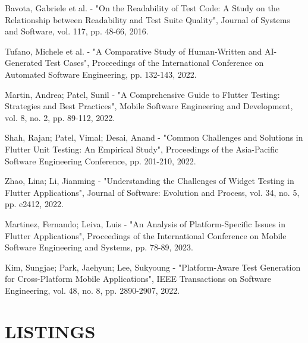 \documentclass[12pt, twoside]{report}
\makeatletter
\newcommand\AppendixName{Appendix}
\let\oldappendix\appendix
\renewcommand{\appendix}{%
  \oldappendix
  \renewcommand{\chaptername}{\AppendixName}  \renewcommand{\thechapter}{\@Alph\c@chapter}}
\makeatother
\begin{document}
\begin{thebibliography}{99}
Bavota, Gabriele et al. - "On the Readability of Test Code: A Study on the Relationship between Readability and Test Suite Quality", Journal of Systems and Software, vol. 117, pp. 48-66, 2016.

Tufano, Michele et al. - "A Comparative Study of Human-Written and AI-Generated Test Cases", Proceedings of the International Conference on Automated Software Engineering, pp. 132-143, 2022.

Martin, Andrea; Patel, Sunil - "A Comprehensive Guide to Flutter Testing: Strategies and Best Practices", Mobile Software Engineering and Development, vol. 8, no. 2, pp. 89-112, 2022.

Shah, Rajan; Patel, Vimal; Desai, Anand - "Common Challenges and Solutions in Flutter Unit Testing: An Empirical Study", Proceedings of the Asia-Pacific Software Engineering Conference, pp. 201-210, 2022.

Zhao, Lina; Li, Jianming - "Understanding the Challenges of Widget Testing in Flutter Applications", Journal of Software: Evolution and Process, vol. 34, no. 5, pp. e2412, 2022.

Martinez, Fernando; Leiva, Luis - "An Analysis of Platform-Specific Issues in Flutter Applications", Proceedings of the International Conference on Mobile Software Engineering and Systems, pp. 78-89, 2023.

Kim, Sungjae; Park, Jaehyun; Lee, Sukyoung - "Platform-Aware Test Generation for Cross-Platform Mobile Applications", IEEE Transactions on Software Engineering, vol. 48, no. 8, pp. 2890-2907, 2022.
\end{thebibliography}

\appendix
\chapter{LISTINGS}

\end{document}

